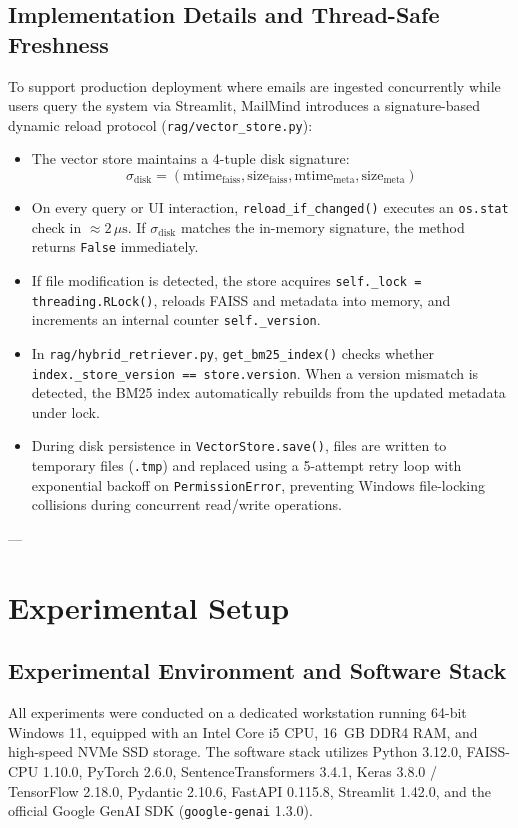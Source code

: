 \documentclass[11pt,a4paper]{article}
\begin{document}
\subsection{Implementation Details and Thread-Safe Freshness}
To support production deployment where emails are ingested concurrently while users query the system via Streamlit, MailMind introduces a signature-based dynamic reload protocol (\texttt{rag/vector\_store.py}):
\begin{itemize}
    \item The vector store maintains a 4-tuple disk signature:
    \begin{equation}
        \sigma_{\text{disk}} = (\text{mtime}_{\text{faiss}}, \text{size}_{\text{faiss}}, \text{mtime}_{\text{meta}}, \text{size}_{\text{meta}})
    \end{equation}
    \item On every query or UI interaction, \texttt{reload\_if\_changed()} executes an \texttt{os.stat} check in $\approx 2\,\mu\text{s}$. If $\sigma_{\text{disk}}$ matches the in-memory signature, the method returns \texttt{False} immediately.
    \item If file modification is detected, the store acquires \texttt{self.\_lock = threading.RLock()}, reloads FAISS and metadata into memory, and increments an internal counter \texttt{self.\_version}.
    \item In \texttt{rag/hybrid\_retriever.py}, \texttt{get\_bm25\_index()} checks whether \texttt{index.\_store\_version == store.version}. When a version mismatch is detected, the BM25 index automatically rebuilds from the updated metadata under lock.
    \item During disk persistence in \texttt{VectorStore.save()}, files are written to temporary files (\texttt{.tmp}) and replaced using a 5-attempt retry loop with exponential backoff on \texttt{PermissionError}, preventing Windows file-locking collisions during concurrent read/write operations.
\end{itemize}

---

\section{Experimental Setup}

\subsection{Experimental Environment and Software Stack}
All experiments were conducted on a dedicated workstation running 64-bit Windows 11, equipped with an Intel Core i5 CPU, 16~GB DDR4 RAM, and high-speed NVMe SSD storage. The software stack utilizes Python 3.12.0, FAISS-CPU 1.10.0, PyTorch 2.6.0, SentenceTransformers 3.4.1, Keras 3.8.0 / TensorFlow 2.18.0, Pydantic 2.10.6, FastAPI 0.115.8, Streamlit 1.42.0, and the official Google GenAI SDK (\texttt{google-genai} 1.3.0).
\end{document}
